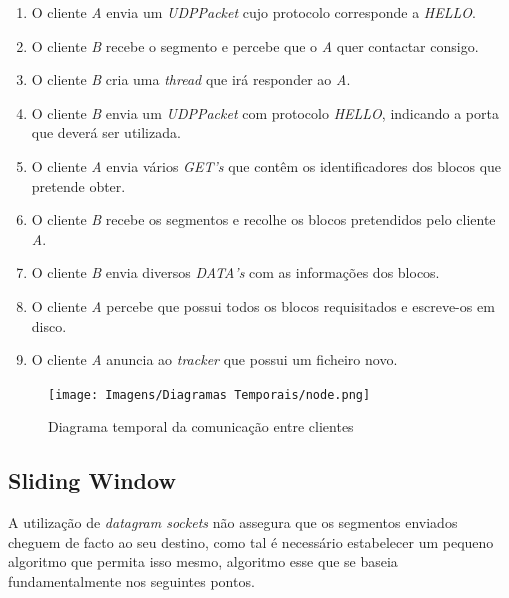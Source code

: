         \begin{enumerate}
            
            \item O cliente \textit{A} envia um \textit{UDPPacket} cujo protocolo corresponde a \textit{HELLO}.

            \item O cliente \textit{B} recebe o segmento e percebe que o \textit{A} quer contactar consigo.

            \item O cliente \textit{B} cria uma \textit{thread} que irá responder ao \textit{A}.

            \item O cliente \textit{B} envia um \textit{UDPPacket} com protocolo \textit{HELLO}, indicando a porta que deverá ser utilizada.

            \item O cliente \textit{A} envia vários \textit{GET's} que contêm os identificadores dos blocos que pretende obter.

            \item O cliente \textit{B} recebe os segmentos e recolhe os blocos pretendidos pelo cliente \textit{A}.

            \item O cliente \textit{B} envia diversos \textit{DATA's} com as informações dos blocos.

            \item O cliente \textit{A} percebe que possui todos os blocos requisitados e escreve-os em disco.

            \item O cliente \textit{A} anuncia ao \textit{tracker} que possui um ficheiro novo.

        \end{enumerate}
        
        \newpage
        \begin{figure}[hb!]
            \centering
            \texttt{[image: Imagens/Diagramas Temporais/node.png]}
            \caption{Diagrama temporal da comunicação entre clientes}
        \end{figure}

    \subsection{Sliding Window}

        A utilização de \textit{datagram sockets} não assegura que os segmentos enviados cheguem de facto ao seu destino, como tal é necessário estabelecer um pequeno algoritmo que permita isso mesmo, algoritmo esse que se baseia fundamentalmente nos seguintes pontos.

